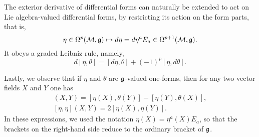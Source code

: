 \documentclass[
final,
11pt,
a4paper,
DIV=11,
headinclude=true,
footinclude=false,
bibliography=totoc,
twoside=true,  %
BCOR=5mm
]{scrbook}
\begin{document}
\begin{subappendices}
The exterior derivative of differential forms can naturally be 
extended to act on Lie algebra-valued differential forms, by 
restricting its action on the form parts, that is,
\begin{equation*}
  \eta \in \Omega^p(\mathcal{M},\mathfrak{g}) \mapsto d\eta = d\eta^a E_a 
  \in \Omega^{p+1}(\mathcal{M},\mathfrak{g}).
\end{equation*}
It obeys a graded Leibniz rule, namely,
\begin{equation*}
  d[\eta,\theta] = [d\eta,\theta] + {(-1)}^p [\eta,d\theta].
\end{equation*}

Lastly, we observe that if $\eta$ and $\theta$ are 
$\mathfrak{g}$-valued one-forms, then for any two vector fields $X$ and 
$Y$ one has \begin{gather*}
  [\eta,\theta](X,Y) = [\eta(X), \theta(Y)] - [\eta(Y), 
  \theta(X)], \\
  [\eta,\eta](X,Y) = 2[\eta(X),\eta(Y)].
\end{gather*}
In these expressions, we used the notation $\eta(X) = 
\eta^a(X)E_a$, so that the brackets on the right-hand side reduce 
to the ordinary bracket of $\mathfrak{g}$.

\end{subappendices}

\begin{comment}
\setchapterpreamble[u]{%
  \dictum[Engraving at Plato's academy. John Tzetzes, 
  Chiliades]{%
    \noindent
    {\dictumgreek%
      mhde'is >agewm'etrhtos e>is'itw mou t{}`hn st'eghn
    }\\
    \hspace{1.3em}
    {\footnotesize
      [let no one inapt to geometry come under my roof]}
  }
  \bigskip
  \dictum[\'{E}lie Cartan, \cite{Cartan:1939sj}, quoted 
  from~\cite{sharpe1997diff_geo}]{%
    In the wake of the movement of ideas which followed the 
    general theory of relativity, I was led to introduce the 
    notion of new geometries, more general than Riemannian 
    geometry, and playing with respect to the different Klein 
    geometries the same role as the Riemannian geometries play 
    with respect to Euclidean space. The vast synthesis that 
    I realized in this way depends of course on the ideas of 
    Klein formulated in his celebrated Erlangen programme while 
    at the same time going far beyond it since it includes 
    Riemannian geometry, which had formed a completely isolated 
    branch of geometry, within the compass of a very general 
    scheme in which the notion of group still plays a fundamental 
    role.
  }
  \dictumendskip%
}
\end{comment}
\end{document}
